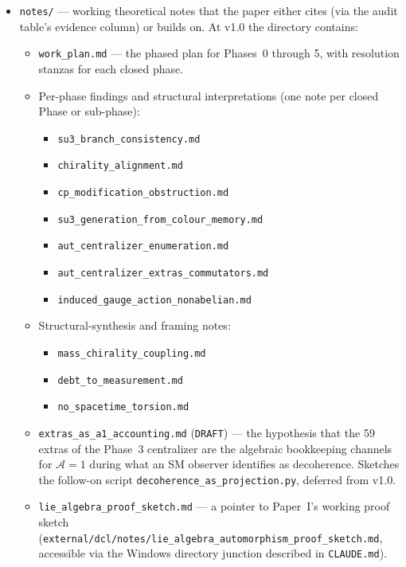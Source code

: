 \begin{itemize}
\item \nolinkurl{notes/} --- working theoretical notes that the
  paper either cites (via the audit table's evidence column) or
  builds on.  At v1.0 the directory contains:
  \begin{itemize}
  \item \nolinkurl{work_plan.md} --- the phased plan for Phases~0
    through 5, with resolution stanzas for each closed phase.
  \item Per-phase findings and structural interpretations
    (one note per closed Phase or sub-phase):
    \begin{itemize}
    \item \nolinkurl{su3_branch_consistency.md}
    \item \nolinkurl{chirality_alignment.md}
    \item \nolinkurl{cp_modification_obstruction.md}
    \item \nolinkurl{su3_generation_from_colour_memory.md}
    \item \nolinkurl{aut_centralizer_enumeration.md}
    \item \nolinkurl{aut_centralizer_extras_commutators.md}
    \item \nolinkurl{induced_gauge_action_nonabelian.md}
    \end{itemize}
  \item Structural-synthesis and framing notes:
    \begin{itemize}
    \item \nolinkurl{mass_chirality_coupling.md}
    \item \nolinkurl{debt_to_measurement.md}
    \item \nolinkurl{no_spacetime_torsion.md}
    \end{itemize}
  \item \nolinkurl{extras_as_a1_accounting.md} (\texttt{DRAFT})
    --- the hypothesis that the 59 extras of the Phase~3
    centralizer are the algebraic bookkeeping channels for
    $\mathcal{A}=1$ during what an SM observer identifies as
    decoherence.  Sketches the follow-on script
    \nolinkurl{decoherence_as_projection.py}, deferred from v1.0.
  \item \nolinkurl{lie_algebra_proof_sketch.md} --- a pointer to
    Paper~I's working proof sketch
    (\nolinkurl{external/dcl/notes/lie_algebra_automorphism_proof_sketch.md},
    accessible via the Windows directory junction described in
    \nolinkurl{CLAUDE.md}).
  \end{itemize}


\end{itemize}
